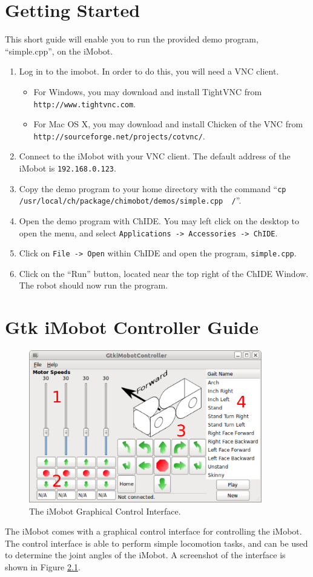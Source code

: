 \documentclass[11pt]{report}
\begin{document}
\chapter{Getting Started}
This short guide will enable you to run the provided demo program,
``simple.cpp'', on the iMobot.
\begin{enumerate}
\item Log in to the imobot. In order to do this, you will need a VNC client. 
  \begin{itemize}
  \item For Windows, you may download and install TightVNC from \texttt{http://www.tightvnc.com}.
  \item For Mac OS X, you may download and install Chicken of the VNC from \texttt{http://sourceforge.net/projects/cotvnc/}.
  \end{itemize}
\item Connect to the iMobot with your VNC client. The default address of the iMobot is \texttt{192.168.0.123}.
\item Copy the demo program to your home directory with the command ``\texttt{cp /usr/local/ch/package/chimobot/demos/simple.cpp ~/}''.
\item Open the demo program with ChIDE. You may left click on the desktop to open the menu, and select \texttt{Applications -> Accessories -> ChIDE}.
\item Click on \texttt{File -> Open} within ChIDE and open the program, \texttt{simple.cpp}. 
\item Click on the ``Run'' button, located near the top right of the ChIDE Window. The robot should now run the program.
\end{enumerate}

\chapter{Gtk iMobot Controller Guide}
\begin{figure}
\begin{center}
\includegraphics[width=4in]{gui_screenshot.png}
\caption{\label{fig:gui}The iMobot Graphical Control Interface.}
\end{center}
\end{figure}
The iMobot comes with a graphical control interface for controlling the iMobot.
The control interface is able to perform simple locomotion tasks, and can be
used to determine the joint angles of the iMobot. A screenshot of the interface
is shown in Figure \ref{fig:gui}.
\end{document}
